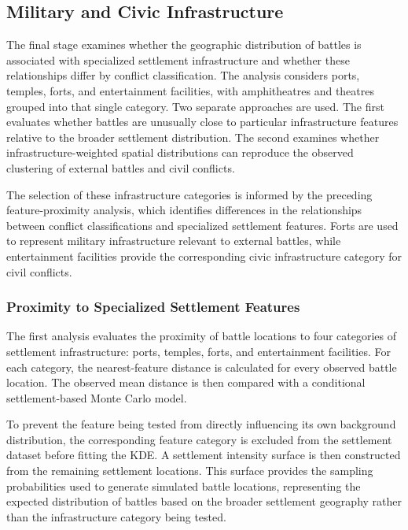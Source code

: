 \documentclass[
  letterpaper,
  DIV=11,
  numbers=noendperiod]{scrartcl}
\begin{document}
\subsection{Military and Civic
Infrastructure}\label{military-and-civic-infrastructure}

The final stage examines whether the geographic distribution of battles
is associated with specialized settlement infrastructure and whether
these relationships differ by conflict classification. The analysis
considers ports, temples, forts, and entertainment facilities, with
amphitheatres and theatres grouped into that single category. Two
separate approaches are used. The first evaluates whether battles are
unusually close to particular infrastructure features relative to the
broader settlement distribution. The second examines whether
infrastructure-weighted spatial distributions can reproduce the observed
clustering of external battles and civil conflicts.

The selection of these infrastructure categories is informed by the
preceding feature-proximity analysis, which identifies differences in
the relationships between conflict classifications and specialized
settlement features. Forts are used to represent military infrastructure
relevant to external battles, while entertainment facilities provide the
corresponding civic infrastructure category for civil conflicts.

\subsubsection{Proximity to Specialized Settlement
Features}\label{proximity-to-specialized-settlement-features}

The first analysis evaluates the proximity of battle locations to four
categories of settlement infrastructure: ports, temples, forts, and
entertainment facilities. For each category, the nearest-feature
distance is calculated for every observed battle location. The observed
mean distance is then compared with a conditional settlement-based Monte
Carlo model.

To prevent the feature being tested from directly influencing its own
background distribution, the corresponding feature category is excluded
from the settlement dataset before fitting the KDE. A settlement
intensity surface is then constructed from the remaining settlement
locations. This surface provides the sampling probabilities used to
generate simulated battle locations, representing the expected
distribution of battles based on the broader settlement geography rather
than the infrastructure category being tested.
\end{document}
